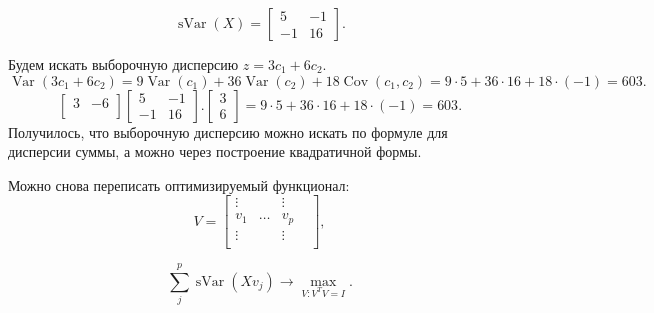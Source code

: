 \documentclass[12pt]{article} %
\theoremstyle{definition} %
\DeclareMathOperator{\Cov}{Cov}
\DeclareMathOperator{\sVar}{sVar}
\DeclareMathOperator{\Var}{Var}
\begin{document}
\[
\sVar(X) =
\begin{bmatrix}
5 & -1 \\
-1 & 16
\end{bmatrix}.
\]


Будем искать выборочную дисперсию \(z = 3c_1 + 6c_2\).
\[ \Var(3c_1+6c_2)=9\Var(c_1) + 36 \Var(c_2) + 18 \Cov(c_1, c_2) = 9 \cdot 5 + 36 \cdot 16 + 18 \cdot (-1) = 603.\]
\[
\begin{bmatrix}
3 & -6 \\
\end{bmatrix}
\begin{bmatrix}
5 & -1 \\
-1 & 16
\end{bmatrix}.
\begin{bmatrix}
3\\
6
\end{bmatrix}=9 \cdot 5 + 36 \cdot 16 + 18 \cdot (-1) = 603.
\]
Получилось, что выборочную дисперсию можно искать по формуле для дисперсии суммы, а можно через построение квадратичной формы.

Можно снова переписать оптимизируемый функционал:
\[
V = \begin{bmatrix}
    \vdots & & \vdots & \\
    v_1 & \dots &v_p \\
    \vdots & & \vdots & \\
    \end{bmatrix},
\]

\[ \sum_{j}^p \sVar(Xv_j) \to \max_{V: V^TV=I}. \]
\end{document}
